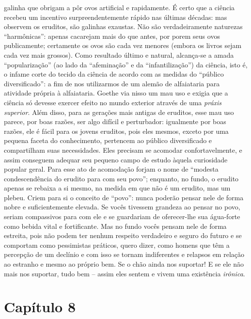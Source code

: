 galinha que obrigam a pôr ovos artificial e rapidamente. É certo que a
ciência recebeu um incentivo surpreendentemente rápido nas últimas
décadas: mas observem os eruditos, são galinhas exaustas. Não são
verdadeiramente naturezas ``harmônicas'': apenas cacarejam mais do que
antes, por porem seus ovos publicamente; certamente os ovos são cada vez
menores (embora os livros sejam cada vez mais grossos). Como resultado
último e natural, alcança-se a amada ``popularização'' (ao lado da
``afeminação'' e da ``infantilização'') da ciência, isto é, o infame
corte do tecido da ciência de acordo com as medidas do ``público
diversificado'': a fim de nos utilizarmos de um alemão de alfaiataria para
atividade própria à alfaiataria. Goethe via nisso um mau uso e exigia
que a ciência só devesse exercer efeito no mundo exterior através de uma
\emph{práxis superior}. Além disso, para as gerações mais antigas de
eruditos, esse mau uso parece, por boas razões, ser algo difícil e
perturbador: igualmente por boas razões, ele é fácil para os jovens
eruditos, pois eles mesmos, exceto por uma pequena faceta do
conhecimento, pertencem ao público diversificado e compartilham suas
necessidades. Eles precisam se acomodar confortavelmente, e assim
conseguem adequar seu pequeno campo de estudo àquela curiosidade popular
geral. Para esse ato de acomodação forjam o nome de ``modesta
condescendência do erudito para com seu povo''; enquanto, no fundo, o
erudito apenas se rebaixa a si mesmo, na medida em que não é um erudito,
mas um plebeu. Criem para si o conceito de ``povo'': nunca poderão
pensar nele de forma nobre e suficientemente elevada. Se vocês tivessem
grandeza ao pensar no povo, seriam compassivos para com ele e se
guardariam de oferecer-lhe sua água-forte como bebida vital e
fortificante. Mas no fundo vocês pensam nele de forma estreita, pois não
podem ter nenhum respeito verdadeiro e seguro do futuro e se comportam
como pessimistas práticos, quero dizer, como homens que têm a percepção
de um declínio e com isso se tornam indiferentes e relapsos em relação
ao estranho e mesmo ao próprio bem. Se o chão ainda nos suportar! E se
ele não mais nos suportar, tudo bem -- assim eles sentem e vivem uma
existência \emph{irônica}.

\chapter{Capítulo 8}\label{capuxedtulo-8}

